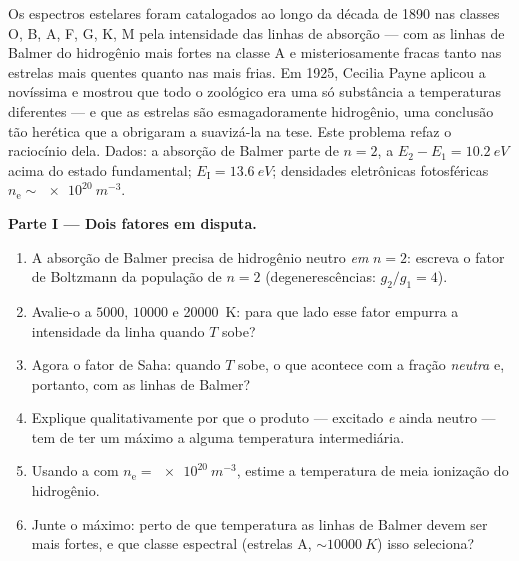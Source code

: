 \begin{problem}\label{pb:b3:grand-canonical:1}
Os espectros estelares foram catalogados ao longo da década de 1890 nas
classes O, B, A, F, G, K, M pela intensidade das linhas de absorção ---
com as linhas de Balmer do hidrogênio mais fortes na classe A e
misteriosamente fracas tanto nas estrelas mais quentes quanto nas mais
frias. Em 1925, Cecilia Payne aplicou a novíssima  e
mostrou que todo o zoológico era uma só substância a temperaturas
diferentes --- e que as estrelas são esmagadoramente hidrogênio, uma
conclusão tão herética que a obrigaram a suavizá-la na tese. Este
problema refaz o raciocínio dela.
Dados: a absorção de Balmer parte de $n = 2$, a $E_2 - E_1 =
\qty{10.2}{eV}$ acima do estado fundamental; $E_{\text{I}} =
\qty{13.6}{eV}$; densidades eletrônicas fotosféricas $n_{\text{e}}
\sim \qty{e20}{m^{-3}}$.

\medskip\noindent\textbf{Parte I --- Dois fatores em disputa.}
\begin{enumerate}
  \item A absorção de Balmer precisa de hidrogênio neutro \emph{em} $n =
        2$: escreva o fator de Boltzmann da população de $n = 2$
        (degenerescências: $g_2/g_1 = 4$).
  \item Avalie-o a $5000$, $10000$ e \qty{20000}{K}: para que
        lado esse fator empurra a intensidade da linha quando $T$ sobe?
  \item Agora o fator de Saha: quando $T$ sobe, o que acontece com a
        fração \emph{neutra} e, portanto, com as linhas de Balmer?
  \item Explique qualitativamente por que o produto --- excitado
        \emph{e} ainda neutro --- tem de ter um máximo a alguma
        temperatura intermediária.
  \item Usando a  com $n_{\text{e}} =
        \qty{e20}{m^{-3}}$, estime a temperatura de
        meia ionização do hidrogênio.
  \item Junte o máximo: perto de que temperatura as linhas de Balmer
        devem ser mais fortes, e que classe espectral
        (estrelas A, $\sim\qty{10000}{K}$) isso seleciona?
\end{enumerate}


\end{problem}

